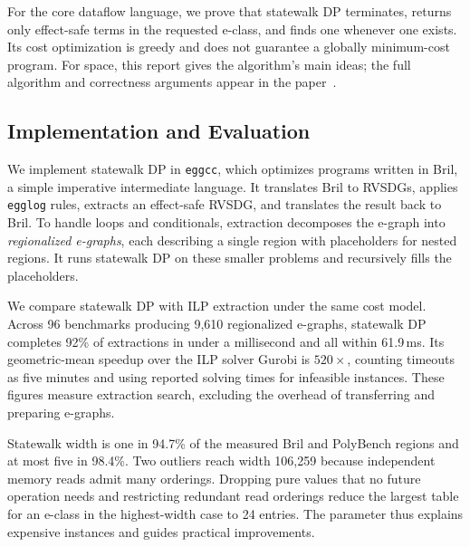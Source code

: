 For the core dataflow language, we prove that statewalk DP terminates,
  returns only effect-safe terms in the requested e-class,
  and finds one whenever one exists.
Its cost optimization is greedy and does not guarantee a globally minimum-cost program.
For space, this report gives the algorithm's main ideas;
  the full algorithm and correctness arguments appear in the paper~\cite{eggcc}.

\subsection{Implementation and Evaluation}
\label{sec:extraction-evaluation}

We implement statewalk DP in \texttt{eggcc}, which optimizes programs written in Bril,
  a simple imperative intermediate language.
It translates Bril to RVSDGs, applies \texttt{egglog} rules, extracts an effect-safe RVSDG,
  and translates the result back to Bril.
To handle loops and conditionals, extraction decomposes the e-graph into
  \emph{regionalized e-graphs}, each describing a single region with placeholders for nested regions.
It runs statewalk DP on these smaller problems and recursively fills the placeholders.

We compare statewalk DP with ILP extraction under the same cost model.
Across 96 benchmarks producing 9,610 regionalized e-graphs,
  statewalk DP completes 92\% of extractions in under a millisecond and all within 61.9\,ms.
Its geometric-mean speedup over the ILP solver Gurobi is $520\times$,
  counting timeouts as five minutes and using reported solving times for infeasible instances.
These figures measure extraction search, excluding the overhead of transferring and preparing e-graphs.

Statewalk width is one in 94.7\% of the measured Bril and PolyBench regions
  and at most five in 98.4\%.
Two outliers reach width 106,259 because independent memory reads admit many orderings.
Dropping pure values that no future operation needs and restricting redundant read orderings
  reduce the largest table for an e-class in the highest-width case to 24 entries.
The parameter thus explains expensive instances and guides practical improvements.

